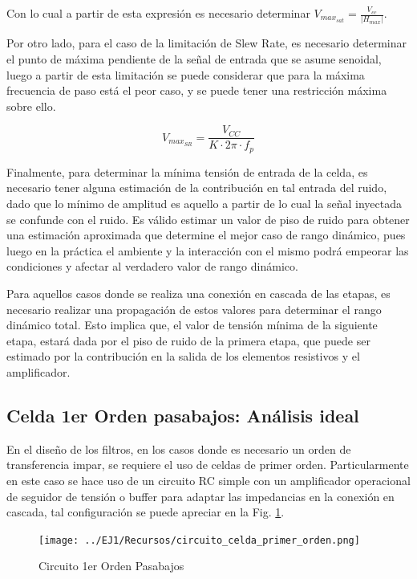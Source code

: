 Con lo cual a partir de esta expresi\'on es necesario determinar $V_{max_{sat}} = \frac{V_{cc}}{|H_{max}|}$.

Por otro lado, para el caso de la limitaci\'on de Slew Rate, es necesario determinar el punto de m\'axima pendiente de la se\~nal de entrada que se asume senoidal,
luego a partir de esta limitaci\'on se puede considerar que para la m\'axima frecuencia de paso est\'a el peor caso, y se puede tener una restricci\'on m\'axima sobre ello.

\begin{equation}
    V_{max_{SR}} = \frac{V_{CC}}{K \cdot 2 \pi \cdot f_p}
\end{equation}

Finalmente, para determinar la m\'inima tensi\'on de entrada de la celda, es necesario tener alguna estimaci\'on de la contribuci\'on en tal entrada del ruido,
dado que lo m\'inimo de amplitud es aquello a partir de lo cual la se\~nal inyectada se confunde con el ruido. Es v\'alido estimar un valor de piso de ruido para obtener
una estimaci\'on aproximada que determine el mejor caso de rango din\'amico, pues luego en la pr\'actica el ambiente y la interacci\'on con el mismo podr\'a empeorar las condiciones
y afectar al verdadero valor de rango din\'amico.

Para aquellos casos donde se realiza una conexi\'on en cascada de las etapas, es necesario realizar una propagaci\'on de estos valores para determinar el rango din\'amico total. Esto implica que,
el valor de tensi\'on m\'inima de la siguiente etapa, estar\'a dada por el piso de ruido de la primera etapa, que puede ser estimado por la contribuci\'on en la salida de los elementos resistivos y el amplificador.

\subsection{Celda 1er Orden pasabajos: An\'alisis ideal}
En el dise\~no de los filtros, en los casos donde es necesario un orden de transferencia impar, se requiere el uso de celdas de primer orden.
Particularmente en este caso se hace uso de un circuito RC simple con un amplificador operacional de seguidor de tensi\'on o buffer para adaptar las impedancias en la conexi\'on en cascada,
tal configuraci\'on se puede apreciar en la Fig. \ref{fig:circuito_pasabajos_primer_orden}.

\begin{figure}[H]
    \centering
        \texttt{[image: ../EJ1/Recursos/circuito\_celda\_primer\_orden.png]}
    \caption{Circuito 1er Orden Pasabajos}
    \label{fig:circuito_pasabajos_primer_orden}
\end{figure}

